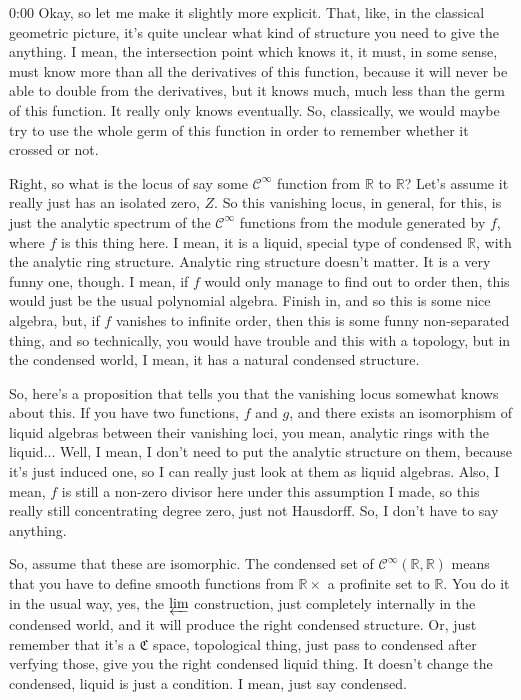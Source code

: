 \begin{unfinished}{0:00}
Okay, so let me make it slightly more explicit. That, like, in the classical geometric picture, it's quite unclear what kind of structure you need to give the anything. I mean, the intersection point which knows it, it must, in some sense, must know more than all the derivatives of this function, because it will never be able to double from the derivatives, but it knows much, much less than the germ of this function. It really only knows eventually. So, classically, we would maybe try to use the whole germ of this function in order to remember whether it crossed or not.

Right, so what is the locus of say some $\mathcal{C}^\infty$ function from $\mathbb{R}$ to $\mathbb{R}$? Let's assume it really just has an isolated zero, $Z$. So this vanishing locus, in general, for this, is just the analytic spectrum of the $\mathcal{C}^\infty$ functions from the module generated by $f$, where $f$ is this thing here. I mean, it is a liquid, special type of condensed $\mathbb{R}$, with the analytic ring structure. Analytic ring structure doesn't matter. It is a very funny one, though. I mean, if $f$ would only manage to find out to order then, this would just be the usual polynomial algebra. Finish in, and so this is some nice algebra, but, if $f$ vanishes to infinite order, then this is some funny non-separated thing, and so technically, you would have trouble and this with a topology, but in the condensed world, I mean, it has a natural condensed structure.

So, here's a proposition that tells you that the vanishing locus somewhat knows about this. If you have two functions, $f$ and $g$, and there exists an isomorphism of liquid algebras between their vanishing loci, you mean, analytic rings with the liquid... Well, I mean, I don't need to put the analytic structure on them, because it's just induced one, so I can really just look at them as liquid algebras. Also, I mean, $f$ is still a non-zero divisor here under this assumption I made, so this really still concentrating degree zero, just not Hausdorff. So, I don't have to say anything.

So, assume that these are isomorphic. The condensed set of $\mathcal{C}^\infty(\mathbb{R}, \mathbb{R})$ means that you have to define smooth functions from $\mathbb{R} \times$ a profinite set to $\mathbb{R}$. You do it in the usual way, yes, the $\varprojlim$ construction, just completely internally in the condensed world, and it will produce the right condensed structure. Or, just remember that it's a $\mathfrak{C}$ space, topological thing, just pass to condensed after verfying those, give you the right condensed liquid thing. It doesn't change the condensed, liquid is just a condition. I mean, just say condensed.


\end{unfinished}
